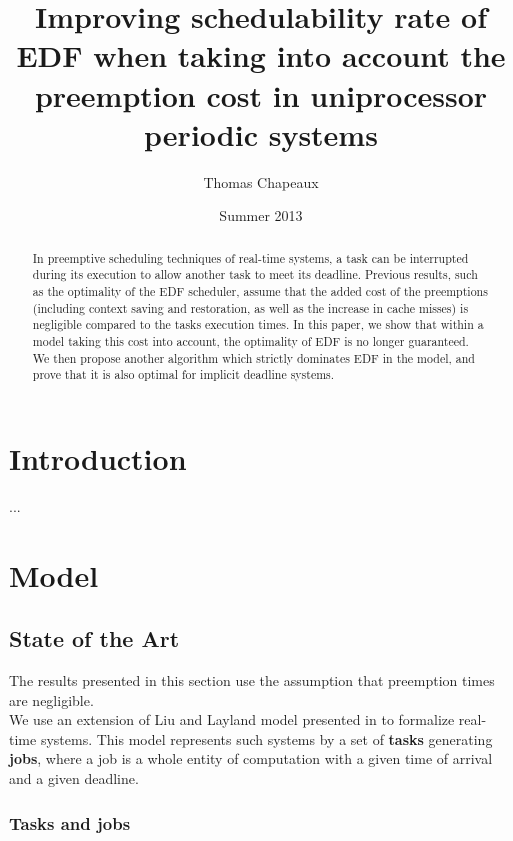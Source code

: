 \documentclass[a4paper,10pt]{article}
\title{Improving schedulability rate of EDF when taking into account the preemption cost in uniprocessor periodic systems}
\author{Thomas Chapeaux}
\date{Summer 2013}
\begin{document}
\maketitle

\tableofcontents

\newpage

\begin{abstract}

In preemptive scheduling techniques of real-time systems, a task can be interrupted during its execution to allow another task to meet its deadline. Previous results, such as the optimality of the EDF scheduler, assume that the added cost of the preemptions (including context saving and restoration, as well as the increase in cache misses) is negligible compared to the tasks execution times. In this paper, we show that within a model taking this cost into account, the optimality of EDF is no longer guaranteed. We then propose another algorithm which strictly dominates EDF in the model, and prove that it is also optimal for implicit deadline systems.

\end{abstract}

\newpage

\section{Introduction}

...

\section{Model}

    \subsection{State of the Art}

        The results presented in this section use the assumption that preemption times are negligible.\\

        We use an extension of Liu and Layland model presented in \cite{Liu:2000:RS:518501} to formalize real-time systems. This model represents such systems by a set of \textbf{tasks} generating \textbf{jobs}, where a job is a whole entity of computation with a given time of arrival and a given deadline.

        \subsubsection{Tasks and jobs}
\end{document}
